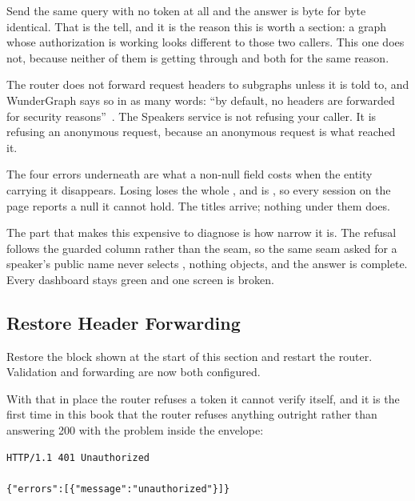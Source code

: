 %
Send the same query with no token at all and the answer is byte for byte
identical. That is the tell, and it is the reason this is worth a section:
a graph whose authorization is working looks different to those two callers.
This one does not, because neither of them is getting through and both for
the same reason.

%
The router does not forward request headers to subgraphs unless it is told
to, and WunderGraph says so in as many words: \enquote{by default, no headers
are forwarded for security reasons}~\autocite{cosmoheaders}. The Speakers
service is not refusing your caller. It is refusing an anonymous request,
because an anonymous request is what reached it.

%
The four errors underneath are what a non-null field costs when the entity
carrying it disappears. Losing  loses the whole ,
and  is , so every session on the page reports a null
it cannot hold. The titles arrive; nothing under them does.

%
The part that makes this expensive to diagnose is how narrow it is. The
refusal follows the guarded column rather than the seam, so the same seam
asked for a speaker's public name never selects , nothing objects,
and the answer is complete. Every dashboard stays green and one screen is
broken.

\subsection{Restore Header Forwarding}

Restore the  block shown at the start of this section and
restart the router. Validation and forwarding are now both configured.


%
With that in place the router refuses a token it cannot verify itself, and it
is the first time in this book that the router refuses anything outright
rather than answering 200 with the problem inside the envelope:

\begin{verbatim}
HTTP/1.1 401 Unauthorized

{"errors":[{"message":"unauthorized"}]}
\end{verbatim}

